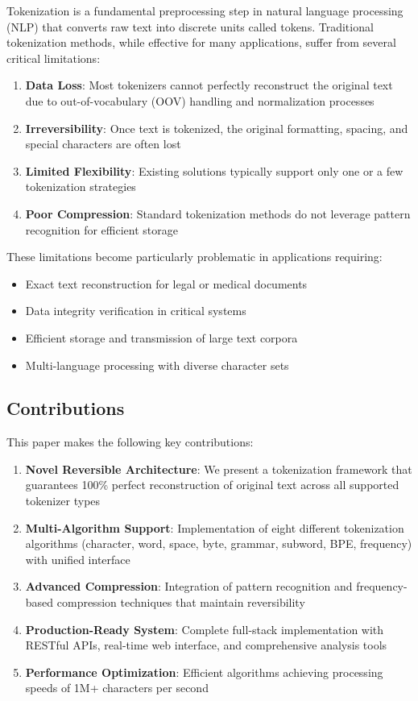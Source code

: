 \documentclass[conference]{IEEEtran}
\begin{document}
Tokenization is a fundamental preprocessing step in natural language processing (NLP) that converts raw text into discrete units called tokens. Traditional tokenization methods, while effective for many applications, suffer from several critical limitations:

\begin{enumerate}
    \item \textbf{Data Loss}: Most tokenizers cannot perfectly reconstruct the original text due to out-of-vocabulary (OOV) handling and normalization processes
    \item \textbf{Irreversibility}: Once text is tokenized, the original formatting, spacing, and special characters are often lost
    \item \textbf{Limited Flexibility}: Existing solutions typically support only one or a few tokenization strategies
    \item \textbf{Poor Compression}: Standard tokenization methods do not leverage pattern recognition for efficient storage
\end{enumerate}

These limitations become particularly problematic in applications requiring:
\begin{itemize}
    \item Exact text reconstruction for legal or medical documents
    \item Data integrity verification in critical systems
    \item Efficient storage and transmission of large text corpora
    \item Multi-language processing with diverse character sets
\end{itemize}

\subsection{Contributions}

This paper makes the following key contributions:

\begin{enumerate}
    \item \textbf{Novel Reversible Architecture}: We present a tokenization framework that guarantees 100\% perfect reconstruction of original text across all supported tokenizer types
    \item \textbf{Multi-Algorithm Support}: Implementation of eight different tokenization algorithms (character, word, space, byte, grammar, subword, BPE, frequency) with unified interface
    \item \textbf{Advanced Compression}: Integration of pattern recognition and frequency-based compression techniques that maintain reversibility
    \item \textbf{Production-Ready System}: Complete full-stack implementation with RESTful APIs, real-time web interface, and comprehensive analysis tools
    \item \textbf{Performance Optimization}: Efficient algorithms achieving processing speeds of 1M+ characters per second
\end{enumerate}
\end{document}

